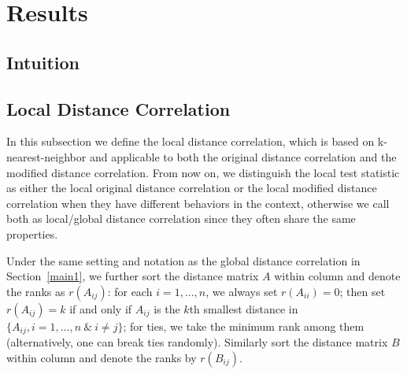 \documentclass[11pt]{article}
\begin{document}
\section{Results}

\subsection{Intuition}





\subsection{Local Distance Correlation}
\label{main2}
In this subsection we define the local distance correlation, which is based on k-nearest-neighbor and applicable to both the original distance correlation and the modified distance correlation. From now on, we distinguish the local test statistic as either the local original distance correlation or the local modified distance correlation when they have different behaviors in the context, otherwise we call both as local/global distance correlation since they often share the same properties.

Under the same setting and notation as the global distance correlation in Section~\ref{main1}, we further sort the distance matrix $A$ within column and denote the ranks as $r(A_{ij})$: for each $i=1, \ldots, n$, we always set $r(A_{ii})=0$; then set $r(A_{ij})=k$ if and only if $A_{ij}$ is the $k$th smallest distance in $\{A_{ij}, i=1,\ldots,n\ \& \ i \neq j\}$; for ties, we take the minimum rank among them (alternatively, one can break ties randomly). Similarly sort the distance matrix $B$ within column and denote the ranks by $r(B_{ij})$.
\end{document}
